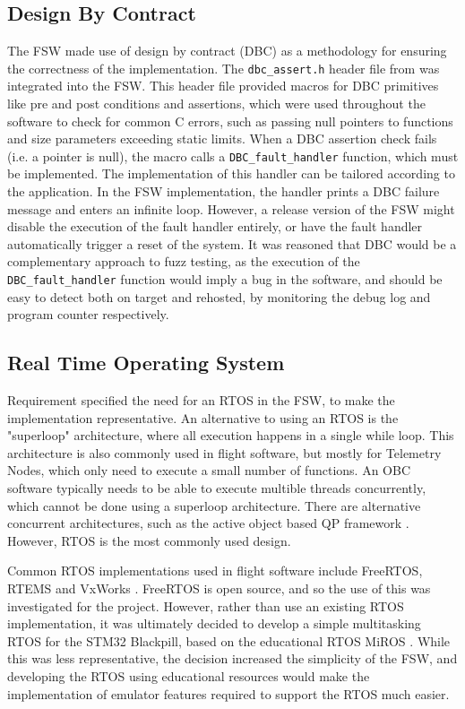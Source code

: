 \documentclass[../report.tex]{subfiles}
\begin{document}
\subsection{Design By Contract}

The FSW made use of design by contract (DBC) as a methodology for ensuring the
correctness of the implementation. The \lstinline|dbc_assert.h| header file
from \citet{dbc_assert} was integrated into the FSW. This header file provided
macros for DBC primitives like pre and post conditions and assertions, which
were used throughout the software to check for common C errors, such as passing
null pointers to functions and size parameters exceeding static limits. When a
DBC assertion check fails (i.e. a pointer is null), the macro calls a
\lstinline|DBC_fault_handler| function, which must be implemented. The
implementation of this handler can be tailored according to the application. In
the FSW implementation, the handler prints a DBC failure message and enters an
infinite loop. However, a release version of the FSW might disable the
execution of the fault handler entirely, or have the fault handler
automatically trigger a reset of the system. It was reasoned that DBC would be
a complementary approach to fuzz testing, as the execution of the
\lstinline|DBC_fault_handler| function would imply a bug in the software, and
should be easy to detect both on target and rehosted, by monitoring the debug
log and program counter respectively.

\subsection{Real Time Operating System}

Requirement  specified the need for an RTOS in the FSW, to make
the implementation representative. An alternative to using an RTOS is the
"superloop" architecture, where all execution happens in a single while loop.
This architecture is also commonly used in flight software, but mostly for
Telemetry Nodes, which only need to execute a small number of functions. An OBC
software typically needs to be able to execute multible threads concurrently,
which cannot be done using a superloop architecture. There are alternative
concurrent architectures, such as the active object based QP framework
\citep{QP}. However, RTOS is the most commonly used design.

Common RTOS implementations used in flight software include FreeRTOS, RTEMS and
VxWorks \citep{Cratere_2024}. FreeRTOS is open source, and so the use of this
was investigated for the project. However, rather than use an existing RTOS
implementation, it was ultimately decided to develop a simple multitasking RTOS
for the STM32 Blackpill, based on the educational RTOS MiROS \citep{miros}.
While this was less representative, the decision increased the simplicity of
the FSW, and developing the RTOS using educational resources would make the
implementation of emulator features required to support the RTOS much easier.
\end{document}
